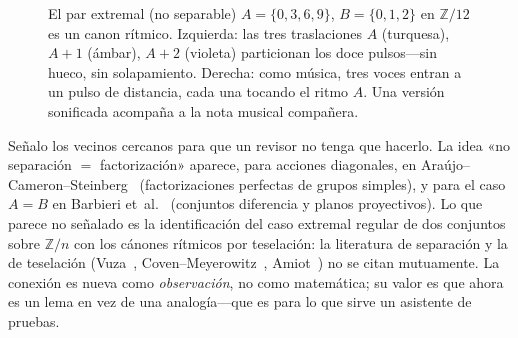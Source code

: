 \documentclass[11pt]{article}
\newcommand{\Z}{\mathbb{Z}}
\begin{document}
\begin{figure}[t]
  \centering
  \caption{El par extremal (no separable) $A=\{0,3,6,9\}$, $B=\{0,1,2\}$ en $\Z/12$ es
  un canon rítmico. Izquierda: las tres traslaciones $A$ (turquesa), $A{+}1$ (ámbar),
  $A{+}2$ (violeta) particionan los doce pulsos---sin hueco, sin solapamiento.
  Derecha: como música, tres voces entran a un pulso de distancia, cada una tocando el
  ritmo $A$. Una versión sonificada acompaña a la nota musical compañera.}
  \label{fig:canon}
\end{figure}

Señalo los vecinos cercanos para que un revisor no tenga que hacerlo. La idea «no
separación $=$ factorización» aparece, para acciones diagonales, en
Araújo--Cameron--Steinberg~\cite{ACS2017} (factorizaciones perfectas de grupos
simples), y para el caso $A=B$ en Barbieri et~al.~\cite{Barbieri2025} (conjuntos
diferencia y planos proyectivos). Lo que parece no señalado es la identificación del
caso extremal regular de dos conjuntos sobre $\Z/n$ con los cánones rítmicos por
teselación: la literatura de separación y la de teselación (Vuza~\cite{Vuza1991},
Coven--Meyerowitz~\cite{CovenMeyerowitz1999}, Amiot~\cite{Amiot2016}) no se citan
mutuamente. La conexión es nueva como \emph{observación}, no como matemática; su valor
es que ahora es un lema en vez de una analogía---que es para lo que sirve un asistente
de pruebas.
\end{document}
